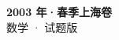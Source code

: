 \documentclass[zihao=-4, a4paper]{ctexart}
\begin{document}
\begin{center}
  {\Large\bfseries 2003 年·春季上海卷}\\[4pt]
  {\large 数学 · 试题版}
\end{center}
\medskip
{}

\end{document}
